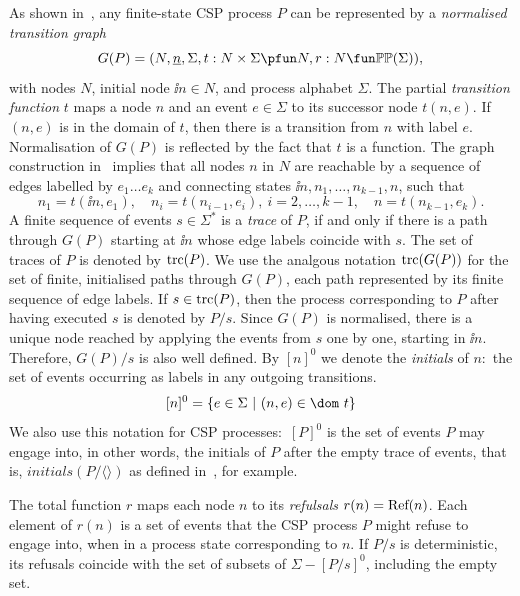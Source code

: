As shown in~\cite{Roscoe:1994:CME:197600}, any finite-state CSP process $P$
can be represented by a \emph{normalised transition graph}
$$
G(P) = ( N, \ii n, \Sigma, t : N\times\Sigma \pfun N, r : N \fun \mathbb{P}\mathbb{P}(\Sigma)),
$$
with nodes $N$, initial node $\ii n\in N$, and process alphabet $\Sigma$. The
partial \emph{transition function} $t$ maps a node $n$ and an event
$e\in\Sigma$ to its successor node $t(n,e)$. If $(n,e)$ is in the domain of
$t$, then there is a transition from $n$ with label $e$. Normalisation of
$G(P)$ is reflected by the fact that $t$ is a function. The graph construction
in~\cite{Roscoe:1994:CME:197600} implies that all nodes $n$ in $N$ are reachable
by a sequence of edges labelled by $e_1\dots e_k$ and connecting states
$\ii n,n_1,\dots,n_{k-1},n$, such that
\[
n_1 = t(\ii n,e_1), \quad n_i = t(n_{i-1},e_i),\ i = 2,\dots,k-1,\quad
n= t(n_{k-1},e_k).
\]
%
A finite sequence of events $s\in\Sigma^*$ is a \emph{trace} of $P$, if and
only if there is a path through $G(P)$ starting  at $\ii n$ whose edge labels
coincide with $s$. The set of traces of $P$ is denoted by $\text{trc}(P)$. We use
the analgous notation $\text{trc}(G(P))$ for the set of finite, initialised paths
through $G(P)$, each path represented by its finite sequence of edge labels.
If $s\in\text{trc}(P)$, then the process corresponding to $P$ after having executed
$s$ is denoted by $P/s$. Since $G(P)$ is normalised, there is a unique node
reached by applying the events from $s$ one by one, starting in $\ii n$.
Therefore, $G(P)/s$  is also well defined. By $[n]^0$ we denote the
\emph{initials} of $n$:~the set of events occurring as labels in any outgoing
transitions.
$$
[n]^0 = \{ e\in\Sigma~|~(n,e)\in\dom~t \}
$$
We also use this notation for CSP processes:~$[P]^0$ is the set of events $P$
may engage into, in other words, the initials of $P$ after the empty trace of
events, that is, $initials(P/\langle\rangle)$ as defined
in~\cite{Roscoe2010}, for example.

The total function $r$ maps each node $n$ to its \emph{refulsals} $r(n) =
\text{Ref}(n)$. Each element of $r(n)$ is a set of events that the CSP process $P$
might refuse to engage into, when in a process state corresponding to $n$.
 If $P/s$ is deterministic, its refusals coincide with the set of
subsets of $\Sigma - [P/s]^0$, including the empty set.

